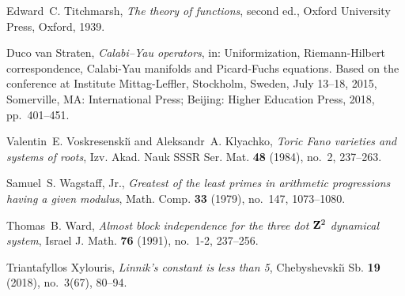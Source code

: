 \documentclass[12pt,reqno]{amsart}
\theoremstyle{definition}
\theoremstyle{plain}
\theoremstyle{definition}
\begin{document}
\begin{thebibliography}{100}
Edward~C. Titchmarsh, \emph{The theory of functions}, second ed., Oxford
  University Press, Oxford, 1939.

Duco van Straten, \emph{{C}alabi--{Y}au operators}, in: Uniformization,
  Riemann-Hilbert correspondence, Calabi-Yau manifolds and Picard-Fuchs
  equations. Based on the conference at Institute Mittag-Leffler, Stockholm,
  Sweden, July 13--18, 2015, Somerville, MA: International Press; Beijing:
  Higher Education Press, 2018, pp.~401--451.

Valentin~E. Voskresenski\u{\i} and Aleksandr~A. Klyachko, \emph{Toric {F}ano
  varieties and systems of roots}, Izv. Akad. Nauk SSSR Ser. Mat. \textbf{48}
  (1984), no.~2, 237--263.

Samuel~S. Wagstaff, Jr., \emph{Greatest of the least primes in arithmetic
  progressions having a given modulus}, Math. Comp. \textbf{33} (1979),
  no.~147, 1073--1080.

Thomas~B. Ward, \emph{Almost block independence for the three dot {${\bf Z}^2$}
  dynamical system}, Israel J. Math. \textbf{76} (1991), no.~1-2, 237--256.

Triantafyllos Xylouris, \emph{Linnik's constant is less than 5},
  Chebyshevski{\u{\i}} Sb. \textbf{19} (2018), no.~3(67), 80--94.

\end{thebibliography}
\end{document}
